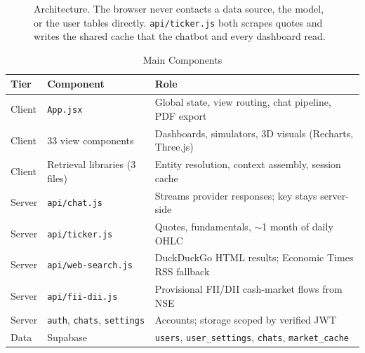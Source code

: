 \documentclass[conference]{IEEEtran}
\newcommand{\code}[1]{\texttt{\small #1}}
\begin{document}
\begin{figure}[t]
\caption{Architecture. The browser never contacts a data source, the model, or the user tables directly. \code{api/ticker.js} both scrapes quotes and writes the shared cache that the chatbot and every dashboard read.}
\label{fig:arch}
\end{figure}

\begin{table}[t]
\caption{Main Components}
\label{tab:components}
\centering
\footnotesize
\begin{tabular}{@{}L{1.0cm}L{2.85cm}L{3.75cm}@{}}
\toprule
Tier & Component & Role \\
\midrule
Client & \code{App.jsx} & Global state, view routing, chat pipeline, PDF export \\
Client & 33 view components & Dashboards, simulators, 3D visuals (Recharts, Three.js) \\
Client & Retrieval libraries (3 files) & Entity resolution, context assembly, session cache \\
Server & \code{api/chat.js} & Streams provider responses; key stays server-side \\
Server & \code{api/ticker.js} & Quotes, fundamentals, $\sim$1 month of daily OHLC \\
Server & \code{api/web-search.js} & DuckDuckGo HTML results; Economic Times RSS fallback \\
Server & \code{api/fii-dii.js} & Provisional FII/DII cash-market flows from NSE \\
Server & \code{auth}, \code{chats}, \code{settings} & Accounts; storage scoped by verified JWT \\
Data & Supabase & \code{users}, \code{user\_settings}, \code{chats}, \code{market\_cache} \\
\bottomrule
\end{tabular}
\end{table}
\end{document}
